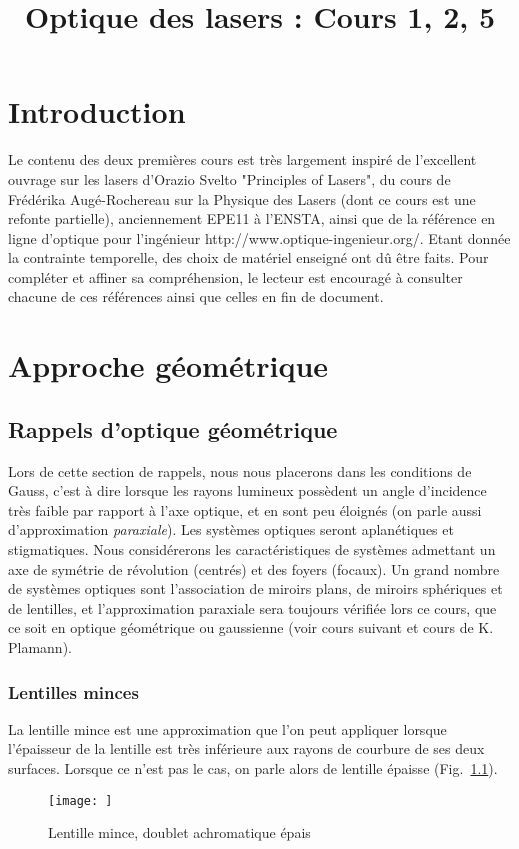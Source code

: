 \documentclass[a4paper]{book}
\title{Optique des lasers : Cours 1, 2, 5}
\author{}
\date{}
\begin{document}
\maketitle

\chapter*{Introduction}

Le contenu des deux premières  cours est très largement inspiré de l'excellent ouvrage sur les lasers d'Orazio Svelto "Principles of Lasers", du cours de Frédérika Augé-Rochereau sur la Physique des Lasers (dont ce cours est une refonte partielle), anciennement EPE11 à l'ENSTA, ainsi que de la référence en ligne d'optique pour l'ingénieur http://www.optique-ingenieur.org/. Etant donnée la contrainte temporelle, des choix de matériel enseigné ont dû être faits. Pour compléter et affiner sa compréhension, le lecteur est encouragé à consulter chacune de ces références ainsi que celles en fin de document.


\chapter{Approche géométrique}

\section{Rappels d'optique géométrique}
Lors de cette section de rappels, nous nous placerons dans les conditions de Gauss, c'est à dire lorsque les rayons lumineux possèdent un angle d'incidence très faible par rapport à l'axe optique, et en sont peu éloignés (on parle aussi d'approximation \textit{paraxiale}). Les systèmes optiques seront aplanétiques et stigmatiques. Nous considérerons les caractéristiques de systèmes admettant un axe de symétrie de révolution (centrés) et des foyers (focaux). Un grand nombre de systèmes optiques sont l’association de miroirs plans, de miroirs sphériques et de lentilles, et l'approximation paraxiale sera toujours vérifiée lors ce cours, que ce soit en optique géométrique ou gaussienne (voir cours suivant et cours de K. Plamann). 

\subsection{Lentilles minces}

La lentille mince est une approximation que l'on peut appliquer lorsque l'épaisseur de la lentille est très inférieure aux rayons de courbure de ses deux surfaces. Lorsque ce n'est pas le cas, on parle alors de lentille épaisse (Fig.~\ref{fig:lentille_mince}). 
\begin{figure}[!htbp]
\begin{center}
\texttt{[image: ]}
\end{center}
\caption{Lentille mince, doublet achromatique épais}
\label{fig:lentille_mince}
\end{figure}
\end{document}
